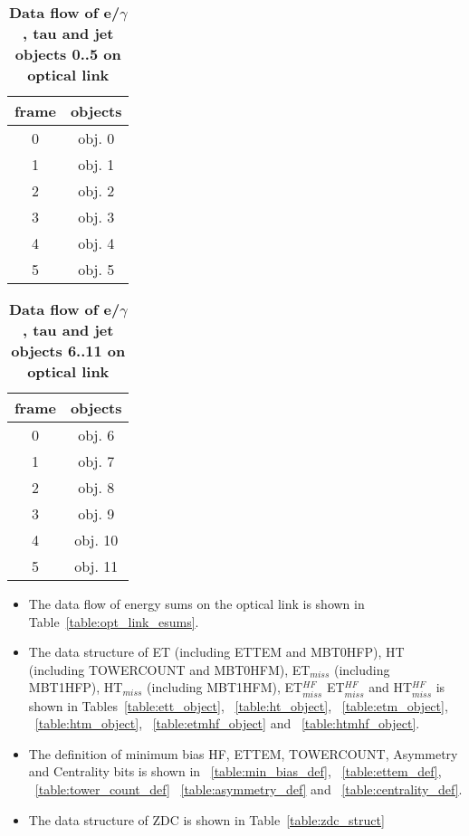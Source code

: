 \documentclass{cmspaper}
\begin{document}
\begin{table}[ht]
\caption{\bf Data flow of e/$\gamma$, tau and jet objects 0..5 on optical link}
\vspace{5mm}
\centering
\begin{tabular}{|c|c|}\hline
frame & objects\\\hline\hline
0 & obj. 0 \\\hline
1 & obj. 1 \\\hline
2 & obj. 2 \\\hline
3 & obj. 3 \\\hline
4 & obj. 4 \\\hline
5 & obj. 5 \\\hline
\end{tabular}
\label{table:opt_link_egamma_obj_0_5}
\end{table}

\begin{table}[ht]
\caption{\bf Data flow of e/$\gamma$, tau and jet objects 6..11 on optical link}
\vspace{5mm}
\centering
\begin{tabular}{|c|c|}\hline
frame & objects\\\hline\hline
0 & obj. 6 \\\hline
1 & obj. 7 \\\hline
2 & obj. 8 \\\hline
3 & obj. 9 \\\hline
4 & obj. 10 \\\hline
5 & obj. 11 \\\hline
\end{tabular}
\label{table:opt_link_egamma_obj_6_11}
\end{table}

\clearpage

\begin{itemize}
\item The data flow of energy sums on the optical link is shown in Table~\ref{table:opt_link_esums}.
\item The data structure of ET (including ETTEM and MBT0HFP), HT (including TOWERCOUNT and MBT0HFM), ET$_{miss}$ (including MBT1HFP), HT$_{miss}$ (including MBT1HFM), ET$_{miss}^{HF}$    ET$_{miss}^{HF}$
and HT$_{miss}^{HF}$
is shown in Tables~\ref{table:ett_object}, ~\ref{table:ht_object}, ~\ref{table:etm_object}, ~\ref{table:htm_object}, ~\ref{table:etmhf_object} and ~\ref{table:htmhf_object}.
\item The definition of minimum bias HF, ETTEM, TOWERCOUNT, Asymmetry and Centrality bits is shown in ~\ref{table:min_bias_def}, ~\ref{table:ettem_def}, ~\ref{table:tower_count_def}
~\ref{table:asymmetry_def} and ~\ref{table:centrality_def}.
\item The data structure of ZDC is shown in Table~\ref{table:zdc_struct}
\end{itemize}
\end{document}
